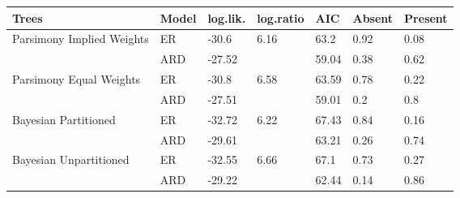 
\begin{tabular}{l|l|l|l|l|l|l}
\hline
Trees & Model & log.lik. & log.ratio & AIC & Absent & Present\\
\hline
Parsimony Implied Weights & ER & -30.6 & 6.16 & 63.2 & 0.92 & 0.08\\
\hline
 & ARD & -27.52 &  & 59.04 & 0.38 & 0.62\\
\hline
Parsimony Equal Weights & ER & -30.8 & 6.58 & 63.59 & 0.78 & 0.22\\
\hline
 & ARD & -27.51 &  & 59.01 & 0.2 & 0.8\\
\hline
Bayesian Partitioned & ER & -32.72 & 6.22 & 67.43 & 0.84 & 0.16\\
\hline
 & ARD & -29.61 &  & 63.21 & 0.26 & 0.74\\
\hline
Bayesian Unpartitioned & ER & -32.55 & 6.66 & 67.1 & 0.73 & 0.27\\
\hline
 & ARD & -29.22 &  & 62.44 & 0.14 & 0.86\\
\hline
\end{tabular}
